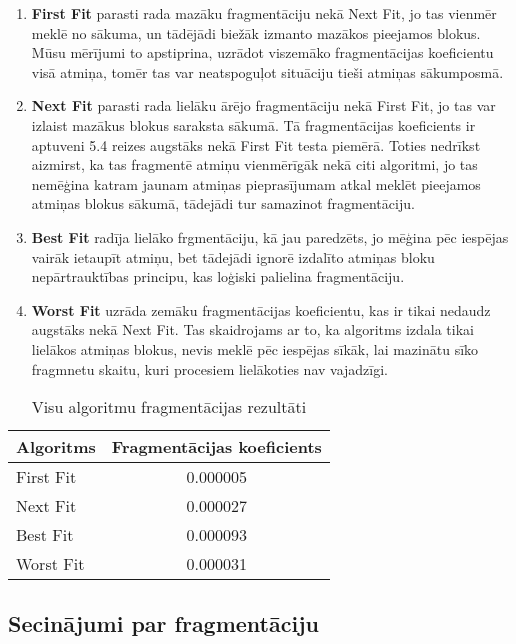 \documentclass{report}
\begin{document}
	\begin{enumerate}
		\item \textbf{First Fit} parasti rada mazāku fragmentāciju nekā Next Fit, jo tas vienmēr meklē no sākuma, un tādējādi biežāk izmanto mazākos pieejamos blokus. Mūsu mērījumi to apstiprina, uzrādot viszemāko fragmentācijas koeficientu visā atmiņa, tomēr tas var neatspoguļot situāciju tieši atmiņas sākumposmā.
		
		\item \textbf{Next Fit} parasti rada lielāku ārējo fragmentāciju nekā First Fit, jo tas var izlaist mazākus blokus saraksta sākumā. Tā fragmentācijas koeficients ir aptuveni 5.4 reizes augstāks nekā First Fit testa piemērā. Toties nedrīkst aizmirst, ka tas fragmentē atmiņu vienmērīgāk nekā citi algoritmi, jo tas nemēģina katram jaunam atmiņas pieprasījumam atkal meklēt pieejamos atmiņas blokus sākumā, tādejādi tur samazinot fragmentāciju.
	
		\item \textbf{Best Fit} radīja lielāko frgmentāciju, kā jau paredzēts, jo mēģina pēc iespējas vairāk ietaupīt atmiņu, bet tādejādi ignorē izdalīto atmiņas bloku nepārtrauktības principu, kas loģiski palielina fragmentāciju.
		
		\item \textbf{Worst Fit} uzrāda zemāku fragmentācijas koeficientu, kas ir tikai nedaudz augstāks nekā Next Fit. Tas skaidrojams ar to, ka algoritms izdala tikai lielākos atmiņas blokus, nevis meklē pēc iespējas sīkāk, lai mazinātu sīko fragmnetu skaitu, kuri procesiem lielākoties nav vajadzīgi. 
	\end{enumerate}

	\begin{table}[h]
		\centering
		\begin{tabular}{lc}
			\toprule
			\textbf{Algoritms} & \textbf{Fragmentācijas koeficients} \\
			\midrule
			First Fit & 0.000005 \\
			Next Fit & 0.000027 \\
			Best Fit & 0.000093 \\
			Worst Fit & 0.000031 \\
			\bottomrule
		\end{tabular}
		\caption{Visu algoritmu fragmentācijas rezultāti}
		\label{tab:fragmentation}
	\end{table}	

	
	\subsection{Secinājumi par fragmentāciju}
	
\end{document}
